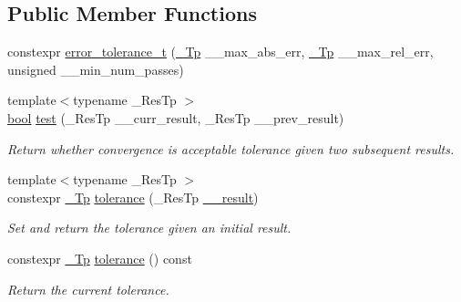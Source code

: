 \subsection*{Public Member Functions}
\begin{DoxyCompactItemize}
\item 
constexpr \hyperlink{struct____gnu__cxx_1_1error__tolerance__t_a4d33e75bacc130e0d0b3edbfdeaea975}{error\+\_\+tolerance\+\_\+t} (\hyperlink{namespace____gnu__cxx_a3b19a9c800ca194374ef9172290f7d79}{\+\_\+\+Tp} \+\_\+\+\_\+max\+\_\+abs\+\_\+err, \hyperlink{namespace____gnu__cxx_a3b19a9c800ca194374ef9172290f7d79}{\+\_\+\+Tp} \+\_\+\+\_\+max\+\_\+rel\+\_\+err, unsigned \+\_\+\+\_\+min\+\_\+num\+\_\+passes)
\item 
{\footnotesize template$<$typename \+\_\+\+Res\+Tp $>$ }\\\hyperlink{namespace____gnu__cxx_ae83aca57f97767d5d09188718728a0ac}{bool} \hyperlink{struct____gnu__cxx_1_1error__tolerance__t_a4376e70909c1b91fe98246a633162497}{test} (\+\_\+\+Res\+Tp \+\_\+\+\_\+curr\+\_\+result, \+\_\+\+Res\+Tp \+\_\+\+\_\+prev\+\_\+result)
\begin{DoxyCompactList}\small\item\em Return whether convergence is acceptable tolerance given two subsequent results. \end{DoxyCompactList}\item 
{\footnotesize template$<$typename \+\_\+\+Res\+Tp $>$ }\\constexpr \hyperlink{namespace____gnu__cxx_a3b19a9c800ca194374ef9172290f7d79}{\+\_\+\+Tp} \hyperlink{struct____gnu__cxx_1_1error__tolerance__t_a2564721b5a7aae5f2a74703dd4c5248a}{tolerance} (\+\_\+\+Res\+Tp \hyperlink{namespace____gnu__cxx_a500ea9f53aeaecd8c2ae657503450578}{\+\_\+\+\_\+result})
\begin{DoxyCompactList}\small\item\em Set and return the tolerance given an initial result. \end{DoxyCompactList}\item 
constexpr \hyperlink{namespace____gnu__cxx_a3b19a9c800ca194374ef9172290f7d79}{\+\_\+\+Tp} \hyperlink{struct____gnu__cxx_1_1error__tolerance__t_a938a772fb23ee5e7476dc9fba9a2d750}{tolerance} () const
\begin{DoxyCompactList}\small\item\em Return the current tolerance. \end{DoxyCompactList}\end{DoxyCompactItemize}
